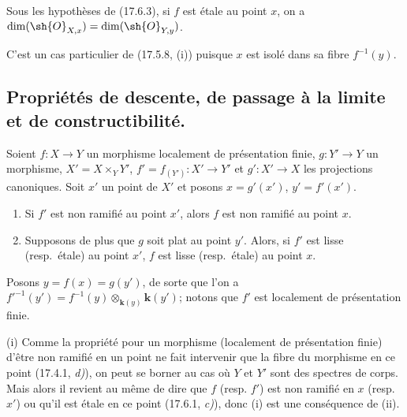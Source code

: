 \begin{proposition}[17.6.4]
\label{IV.17.6.4}
Sous les hypothèses de \textup{(17.6.3)}, si $f$ est étale au point $x$, on a $\dim(\sh{O}_{X,x})=\dim(\sh{O}_{Y,y})$.
\end{proposition}

C'est un cas particulier de (17.5.8, (i)) puisque $x$ est isolé dans sa fibre $f^{-1}(y)$.


\subsection{Propriétés de descente, de passage à la limite et de constructibilité.}
\label{IV.17.7}

\begin{proposition}[17.7.1]
\label{IV.17.7.1}
Soient $f:X\to Y$ un morphisme localement de présentation finie, $g:Y'\to Y$ un morphisme, $X'=X\times_Y Y'$, $f'=f_{(Y')}:X'\to Y'$ et $g':X'\to X$ les projections canoniques. Soit $x'$ un point de $X'$ et posons $x=g'(x')$, $y'=f'(x')$.
\begin{enumerate}
  \item[\textup{(i)}] Si $f'$ est non ramifié au point $x'$, alors $f$ est non ramifié au point $x$.
  \item[\textup{(ii)}] Supposons de plus que $g$ soit plat au point $y'$. Alors, si $f'$ est lisse \textup{(resp.}\ étale\textup{)} au point $x'$, $f$ est lisse \textup{(resp.}\ étale\textup{)} au point $x$.
\end{enumerate}
\end{proposition}

Posons $y=f(x)=g(y')$, de sorte que l'on a $f'^{-1}(y')=f^{-1}(y)\otimes_{\mathbf{k}(y)}\boldsymbol{k}(y')$; notons que $f'$ est localement de présentation finie.

(i) Comme la propriété pour un morphisme (localement de présentation finie) d'être non ramifié en un point ne fait intervenir que la fibre du morphisme en ce point (17.4.1, \emph{d)}), on peut se borner au cas où $Y$ et $Y'$ sont des spectres de corps. Mais alors il revient au même de dire que $f$ (resp. $f'$) est non ramifié en $x$ (resp. $x'$) ou qu'il est étale en ce point (17.6.1, \emph{c)}), donc (i) est une conséquence de (ii).

